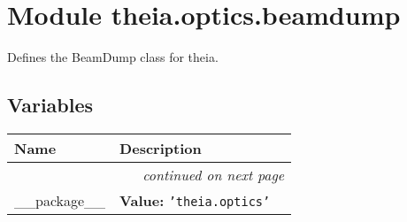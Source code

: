 %
%
%


\section{Module theia.optics.beamdump}

    \label{theia:optics:beamdump}
Defines the BeamDump class for theia.



  \subsection{Variables}

    \vspace{-1cm}
\hspace{\varindent}\begin{longtable}{|p{\varnamewidth}|p{\vardescrwidth}|l}
\cline{1-2}
\cline{1-2} \centering \textbf{Name} & \centering \textbf{Description}& \\
\cline{1-2}
\endhead\cline{1-2}\multicolumn{3}{r}{\small\textit{continued on next page}}\\\endfoot\cline{1-2}
\endlastfoot\raggedright \_\-\_\-p\-a\-c\-k\-a\-g\-e\-\_\-\_\- & \raggedright \textbf{Value:} 
{\tt \texttt{'}\texttt{theia.optics}\texttt{'}}&\\
\cline{1-2}
\end{longtable}



